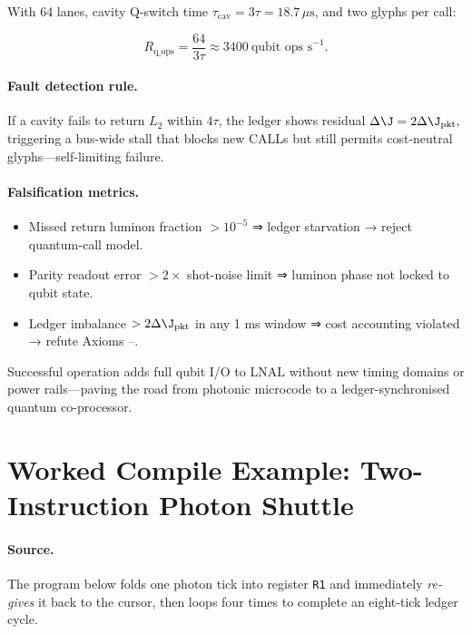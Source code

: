 \documentclass[11pt,oneside]{book}
\begin{document}
With 64 lanes, cavity Q-switch time
\(\tau_{\text{cav}} = 3\tau = 18.7\,\mu\text{s}\),
and two glyphs per call:

\[
R_{\text{q\_ops}}
  = \frac{64}{3\tau}\approx 3400\ \text{qubit ops s}^{-1}.
\]

\paragraph{Fault detection rule.}

If a cavity fails to return $L_{2}$ within
\(4\tau\),
the ledger shows residual
\(
\Delta\J = 2\Delta\J_{\text{pkt}},
\)
triggering a bus-wide stall that blocks new \textsf{CALL}s but still
permits cost-neutral glyphs—self-limiting failure.

\paragraph{Falsification metrics.}

\begin{itemize}[leftmargin=*,itemsep=3pt]
\item Missed return luminon fraction $>10^{-5}$  
      ⇒ ledger starvation → reject quantum-call model.
\item Parity readout error $>2\times$ shot-noise limit  
      ⇒ luminon phase not locked to qubit state.
\item Ledger imbalance $>2\Delta\J_{\text{pkt}}$ in any 1 ms window  
      ⇒ cost accounting violated → refute Axioms –.
\end{itemize}

Successful operation adds full qubit I/O to LNAL without new timing
domains or power rails—paving the road from photonic microcode to a
ledger-synchronised quantum co-processor.


\section{Worked Compile Example: Two-Instruction Photon Shuttle}
\label{sec:lnal-compile-example}

\paragraph*{Source.}
The program below folds one photon tick into register \texttt{R1}
and immediately \emph{re-gives} it back to the cursor,
then loops four times to complete an eight-tick ledger cycle.
\end{document}

